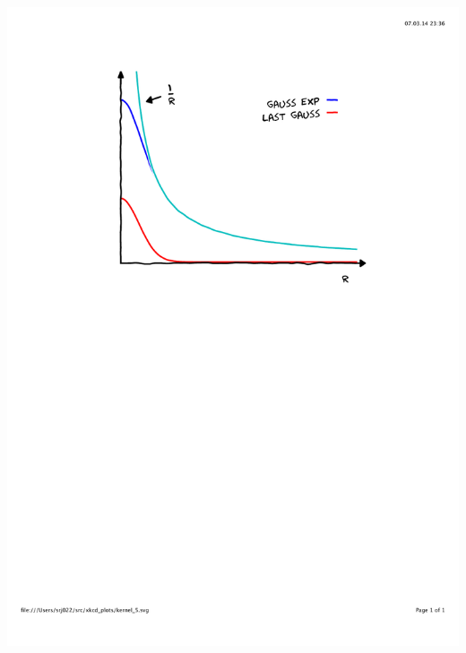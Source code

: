 \begin{frame}
\begin{columns}
\begin{column}{.45\textwidth}
{        \includegraphics[scale=0.4, clip, viewport = 110 450 490 800] {figures/kernel_5.pdf}}
\end{column}
\end{columns}
\end{frame}
